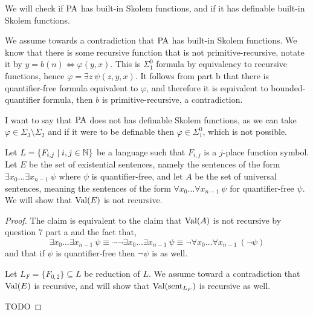 \subquestion{}
We will check if $\operatorname{PA}$ has built-in Skolem functions, and if it has definable built-in Skolem functions.
\begin{solution}
	We assume towards a contradiction that $\operatorname{PA}$ has built-in Skolem functions.
	We know that there is some recursive function that is not primitive-recursive, notate it by $y = b(n) \iff \varphi(y, x)$.
	This is $\Sigma_1^0$ formula by equivalency to recursive functions, hence $\varphi = \exists z\ \psi(z, y, x)$.
	It follows from part b that there is quantifier-free formula equivalent to $\varphi$, and therefore it is equivalent to bounded-quantifier formula, then $b$ is primitive-recursive, a contradiction.

	I want to say that $\operatorname{PA}$ does not has definable Skolem functions, as we can take $\varphi \in \Sigma_3 \setminus \Sigma_2$ and if it were to be definable then $\varphi \in \Sigma_1^0$, which is not possible.
\end{solution}

\question{}
Let $L = \{ F_{i, j} \mid i, j \in \mathbb{N} \}$ be a language such that $F_{i, j}$ is a $j$-place function symbol.
Let $E$ be the set of existential sentences, namely the sentences of the form $\exists x_0 \ldots \exists x_{n - 1}\ \psi$ where $\psi$ is quantifier-free,
and let $A$ be the set of universal sentences, meaning the sentences of the form $\forall x_0 \ldots \forall x_{n - 1}\ \psi$ for quantifier-free $\psi$. \\
We will show that $\operatorname{Val}(E)$ is not recursive.
\begin{proof}
	The claim is equivalent to the claim that $\operatorname{Val}(A)$ is not recursive by question 7 part a and the fact that,
	\[
		\exists x_0 \ldots \exists x_{n - 1}\ \psi
		\equiv \lnot \lnot \exists x_0 \ldots \exists x_{n - 1}\ \psi
		\equiv \lnot \forall x_0 \ldots \forall x_{n - 1}\ (\lnot \psi)
	\]
	and that if $\psi$ is quantifier-free then $\lnot \psi$ is as well.

	Let $L_F = \{ F_{0, 2} \} \subseteq L$ be reduction of $L$.
	We assume toward a contradiction that $\operatorname{Val}(E)$ is recursive, and will show that $\operatorname{Val}(\operatorname{sent}_{L_F})$ is recursive as well.

	TODO
\end{proof}

